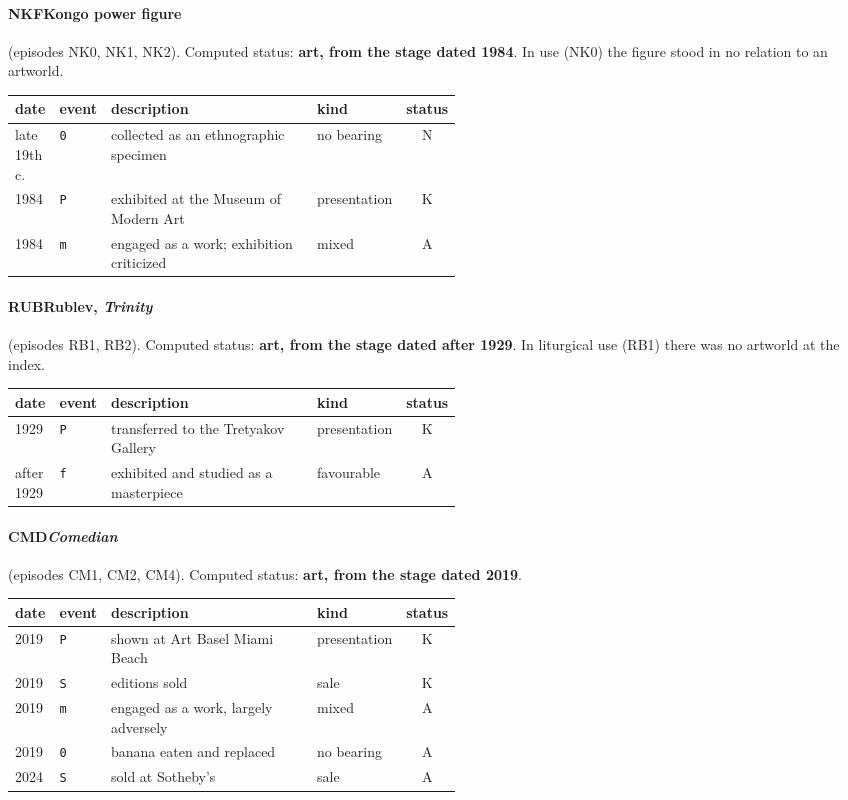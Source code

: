 \paragraph{NKF\enspace Kongo power figure} (episodes NK0, NK1, NK2). Computed status: \textbf{art, from the stage dated 1984}. In use (NK0) the figure stood in no relation to an artworld.
\begin{center}\footnotesize\begin{tabular}{@{}llp{0.52\linewidth}lc@{}}
date & event & description & kind & status \\ \midrule
late 19th c. & \texttt{0} & collected as an ethnographic specimen & no bearing & N \\
1984 & \texttt{P} & exhibited at the Museum of Modern Art & presentation & K \\
1984 & \texttt{m} & engaged as a work; exhibition criticized & mixed & A \\
\end{tabular}\end{center}

\paragraph{RUB\enspace Rublev, \emph{Trinity}} (episodes RB1, RB2). Computed status: \textbf{art, from the stage dated after 1929}. In liturgical use (RB1) there was no artworld at the index.
\begin{center}\footnotesize\begin{tabular}{@{}llp{0.52\linewidth}lc@{}}
date & event & description & kind & status \\ \midrule
1929 & \texttt{P} & transferred to the Tretyakov Gallery & presentation & K \\
after 1929 & \texttt{f} & exhibited and studied as a masterpiece & favourable & A \\
\end{tabular}\end{center}

\paragraph{CMD\enspace \emph{Comedian}} (episodes CM1, CM2, CM4). Computed status: \textbf{art, from the stage dated 2019}.
\begin{center}\footnotesize\begin{tabular}{@{}llp{0.52\linewidth}lc@{}}
date & event & description & kind & status \\ \midrule
2019 & \texttt{P} & shown at Art Basel Miami Beach & presentation & K \\
2019 & \texttt{S} & editions sold & sale & K \\
2019 & \texttt{m} & engaged as a work, largely adversely & mixed & A \\
2019 & \texttt{0} & banana eaten and replaced & no bearing & A \\
2024 & \texttt{S} & sold at Sotheby's & sale & A \\
\end{tabular}\end{center}

